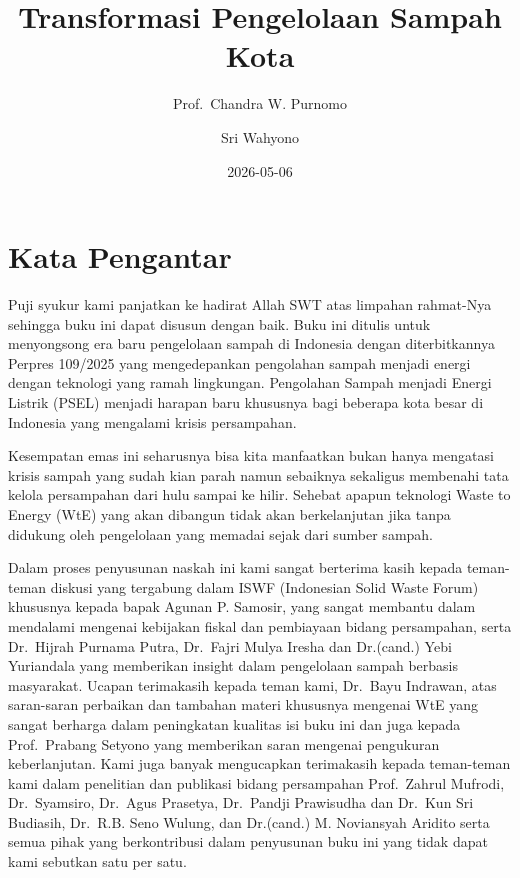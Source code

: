 \documentclass[
  letterpaper,
  DIV=11,
  numbers=noendperiod]{scrreprt}
\title{Transformasi Pengelolaan Sampah Kota}
\author{Prof.~Chandra W. Purnomo \and Sri Wahyono}
\date{2026-05-06}
\renewcommand*\contentsname{Table of contents}
\newcommand\contentsname{Table of contents}
\begin{document}
\maketitle

\renewcommand*\contentsname{Table of contents}
{
\setcounter{tocdepth}{2}
\tableofcontents
}


\chapter*{Kata Pengantar}\label{kata-pengantar}


Puji syukur kami panjatkan ke hadirat Allah SWT atas limpahan rahmat-Nya
sehingga buku ini dapat disusun dengan baik. Buku ini ditulis untuk
menyongsong era baru pengelolaan sampah di Indonesia dengan
diterbitkannya Perpres 109/2025 yang mengedepankan pengolahan sampah
menjadi energi dengan teknologi yang ramah lingkungan. Pengolahan Sampah
menjadi Energi Listrik (PSEL) menjadi harapan baru khususnya bagi
beberapa kota besar di Indonesia yang mengalami krisis persampahan.

Kesempatan emas ini seharusnya bisa kita manfaatkan bukan hanya
mengatasi krisis sampah yang sudah kian parah namun sebaiknya sekaligus
membenahi tata kelola persampahan dari hulu sampai ke hilir. Sehebat
apapun teknologi Waste to Energy (WtE) yang akan dibangun tidak akan
berkelanjutan jika tanpa didukung oleh pengelolaan yang memadai sejak
dari sumber sampah.

Dalam proses penyusunan naskah ini kami sangat berterima kasih kepada
teman-teman diskusi yang tergabung dalam ISWF (Indonesian Solid Waste
Forum) khususnya kepada bapak Agunan P. Samosir, yang sangat membantu
dalam mendalami mengenai kebijakan fiskal dan pembiayaan bidang
persampahan, serta Dr.~Hijrah Purnama Putra, Dr.~Fajri Mulya Iresha dan
Dr.(cand.) Yebi Yuriandala yang memberikan insight dalam pengelolaan
sampah berbasis masyarakat. Ucapan terimakasih kepada teman kami,
Dr.~Bayu Indrawan, atas saran-saran perbaikan dan tambahan materi
khususnya mengenai WtE yang sangat berharga dalam peningkatan kualitas
isi buku ini dan juga kepada Prof.~Prabang Setyono yang memberikan saran
mengenai pengukuran keberlanjutan. Kami juga banyak mengucapkan
terimakasih kepada teman-teman kami dalam penelitian dan publikasi
bidang persampahan Prof.~Zahrul Mufrodi, Dr.~Syamsiro, Dr.~Agus
Prasetya, Dr.~Pandji Prawisudha dan Dr.~Kun Sri Budiasih, Dr.~R.B. Seno
Wulung, dan Dr.(cand.) M. Noviansyah Aridito serta semua pihak yang
berkontribusi dalam penyusunan buku ini yang tidak dapat kami sebutkan
satu per satu.
\end{document}
